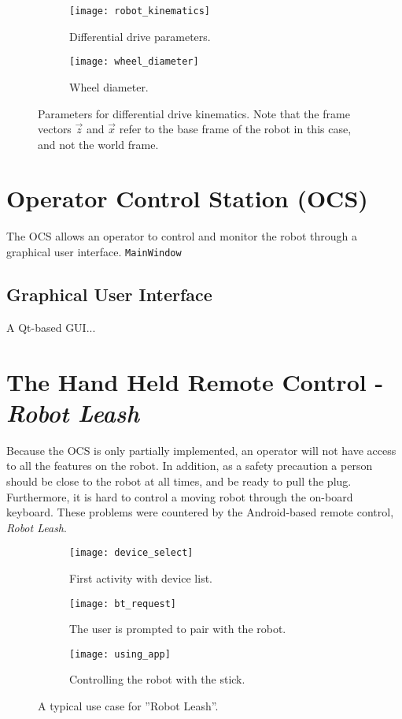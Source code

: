  \begin{figure}
 	\centering
 	\begin{subfigure}[b]{0.58\textwidth}
 		\texttt{[image: robot\_kinematics]}
 		\caption{Differential drive parameters.}
 		\label{fig:robot_kinematics}
 	\end{subfigure}
 	\begin{subfigure}[b]{0.38\textwidth}
 		
 		\texttt{[image: wheel\_diameter]}
 		\caption{Wheel diameter.}
 		\label{fig:wheel_diameter}
 	\end{subfigure}
 	\caption{\label{fig:robot_kinematics}Parameters for differential drive kinematics. Note that the frame vectors $\vec{z}$ and $\vec{x}$ refer to the base frame of the robot in this case, and not the world frame.}
 \end{figure}

\section{Operator Control Station (OCS)}

The \ac{OCS} allows an operator to control and monitor the robot through a graphical user interface. \texttt{MainWindow}

\subsection{Graphical User Interface}

A Qt-based \ac{GUI}...

\section{The Hand Held Remote Control - \textit{Robot Leash}}

Because the \ac{OCS} is only partially implemented, an operator will not have access to all the features on the robot. In addition, as a safety precaution a person should be close to the robot at all times, and be ready to pull the plug. Furthermore, it is hard to control a moving robot through the on-board keyboard. These problems were countered by the Android-based remote control, \textit{Robot Leash}. 


\begin{figure}
	\centering
	\begin{subfigure}[b]{0.30\textwidth}
		\texttt{[image: device\_select]}
		\caption{First activity with device list.}
		\label{fig:device_select}
	\end{subfigure}
		\begin{subfigure}[b]{0.30\textwidth}
			\texttt{[image: bt\_request]}
			\caption{The user is prompted to pair with the robot.}
			\label{fig:bt_request}
		\end{subfigure}
	\begin{subfigure}[b]{0.30\textwidth}
		\texttt{[image: using\_app]}
		\caption{Controlling the robot with the stick.}
		\label{fig:using_app}
	\end{subfigure}
	\caption{\label{fig:app_screens}A typical use case for ''Robot Leash''.}
\end{figure}

